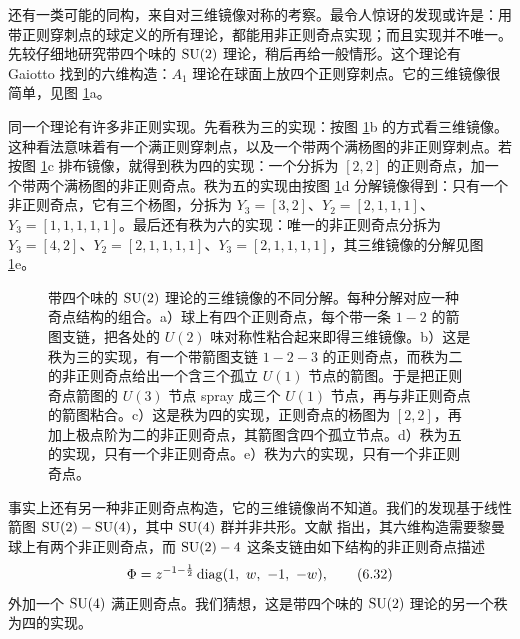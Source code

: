 
还有一类可能的同构，来自对三维镜像对称的考察。最令人惊讶的发现或许是：用带正则穿刺点的球定义的所有理论，都能用非正则奇点实现；而且实现并不唯一。先较仔细地研究带四个味的 $\operatorname{SU}(2)$ 理论，稍后再给一般情形。这个理论有 Gaiotto 找到的六维构造：$A_1$ 理论在球面上放四个正则穿刺点。它的三维镜像很简单，见图 \ref{fig:19}a。

同一个理论有许多非正则实现。先看秩为三的实现：按图 \ref{fig:19}b 的方式看三维镜像。这种看法意味着有一个满正则穿刺点，以及一个带两个满杨图的非正则穿刺点。若按图 \ref{fig:19}c 排布镜像，就得到秩为四的实现：一个分拆为 $[2,2]$ 的正则奇点，加一个带两个满杨图的非正则奇点。秩为五的实现由按图 \ref{fig:19}d 分解镜像得到：只有一个非正则奇点，它有三个杨图，分拆为 $Y_3=[3,2]$、$Y_2=[2,1,1,1]$、$Y_3=[1,1,1,1,1]$。最后还有秩为六的实现：唯一的非正则奇点分拆为 $Y_3=[4,2]$、$Y_2=[2,1,1,1,1]$、$Y_3=[2,1,1,1,1]$，其三维镜像的分解见图 \ref{fig:19}e。

\begin{figure}[tbp]
\centering

\caption{带四个味的 $\operatorname{SU}(2)$ 理论的三维镜像的不同分解。每种分解对应一种奇点结构的组合。a）球上有四个正则奇点，每个带一条 $1-2$ 的箭图支链，把各处的 $U(2)$ 味对称性粘合起来即得三维镜像。b）这是秩为三的实现，有一个带箭图支链 $1-2-3$ 的正则奇点，而秩为二的非正则奇点给出一个含三个孤立 $U(1)$ 节点的箭图。于是把正则奇点箭图的 $U(3)$ 节点 spray 成三个 $U(1)$ 节点，再与非正则奇点的箭图粘合。c）这是秩为四的实现，正则奇点的杨图为 $[2,2]$，再加上极点阶为二的非正则奇点，其箭图含四个孤立节点。d）秩为五的实现，只有一个非正则奇点。e）秩为六的实现，只有一个非正则奇点。}
\label{fig:19}
\end{figure}

事实上还有另一种非正则奇点构造，它的三维镜像尚不知道。我们的发现基于线性箭图 $\operatorname{SU}(2)-\operatorname{SU}(4)$，其中 $\operatorname{SU}(4)$ 群并非共形。文献 \cite{32} 指出，其六维构造需要黎曼球上有两个非正则奇点，而 $\operatorname{SU}(2)-4$ 这条支链由如下结构的非正则奇点描述
\begin{equation}
\Phi = z^{-1-\frac{1}{2}}\diag(1,\ w,\ -1,\ -w) ,
\label{eq:6.32}\tag{6.32}
\end{equation}
外加一个 $\operatorname{SU}(4)$ 满正则奇点。我们猜想，这是带四个味的 $\operatorname{SU}(2)$ 理论的另一个秩为四的实现。

